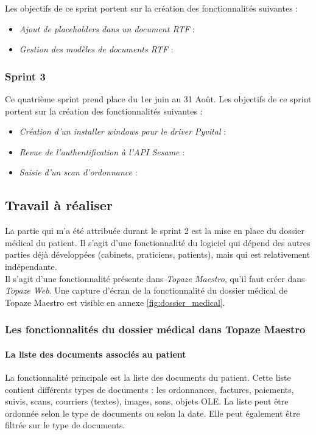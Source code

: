 
Les objectifs de ce sprint portent sur la création des fonctionnalités suivantes :
\begin{itemize}
\item \textit{Ajout de placeholders dans un document RTF} : 
\item \textit{Gestion des modèles de documents RTF} : 
\end{itemize}

\subsubsection{Sprint 3}
Ce quatrième sprint prend place du 1er juin au 31 Août.
Les objectifs de ce sprint portent sur la création des fonctionnalités suivantes :
\begin{itemize}
\item \textit{Création d'un installer windows pour le driver Pyvital} :
\item \textit{Revue de l'authentification à l'API Sesame} :
\item \textit{Saisie d'un scan d'ordonnance} :
\end{itemize}

\subsection{Travail à réaliser}

La partie qui m'a été attribuée durant le sprint 2 est la mise en place du dossier médical du patient. Il s'agit d'une fonctionnalité du logiciel qui dépend des autres parties déjà développées (cabinets, praticiens, patients), mais qui est relativement indépendante. \\

Il s'agit d'une fonctionnalité présente dans \textit{Topaze Maestro}, qu'il faut créer dans \textit{Topaze Web}.
Une capture d'écran de la fonctionnalité du dossier médical de Topaze Maestro est visible en annexe \ref{fig:dossier_medical}.


\subsubsection{Les fonctionnalités du dossier médical dans Topaze Maestro}
\paragraph*{La liste des documents associés au patient\\}
La fonctionnalité principale est la liste des documents du patient. Cette liste contient différents types de documents : les ordonnances, factures, paiements, suivis, scans, courriers (textes), images, sons, objets \gls{OLE}. La liste peut être ordonnée selon le type de documents ou selon la date. Elle peut également être filtrée sur le type de documents.

